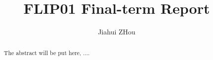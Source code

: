 \documentclass{amsart}
\begin{document}
%
%
\title[FLIP01 Report]{FLIP01 Final-term Report}%

\author{Jiahui ZHou}
\address[A.~1]{School of Computer Science,\\ 
Xi'an Shiyou University, Shaanxi 710065, China}%

%
%
\date{\gitAuthorDate}%

\begin{abstract}
The abstract will be put here, ....
\end{abstract}

\maketitle
\tableofcontents

\newpage



\newpage



\listoftodos
\end{document}
